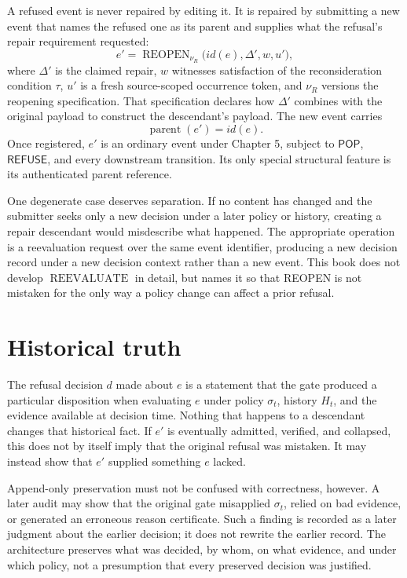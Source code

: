 \documentclass[11pt,openany]{book}
\newcommand{\Pop}{\mathsf{POP}}
\newcommand{\Refuse}{\mathsf{REFUSE}}
\begin{document}
A refused event is never repaired by editing it. It is repaired by submitting
a new event that names the refused one as its parent and supplies what the
refusal's repair requirement requested:
\[
 e'=\operatorname{REOPEN}_{\nu_R}\bigl(id(e),\Delta',w,u'\bigr),
\]
where \(\Delta'\) is the claimed repair, \(w\) witnesses satisfaction of the
reconsideration condition \(\tau\), \(u'\) is a fresh source-scoped occurrence
token, and \(\nu_R\) versions the reopening specification. That specification
declares how \(\Delta'\) combines with the original payload to construct the
descendant's payload. The new event carries
\[
 \operatorname{parent}(e')=id(e).
\]
Once registered, \(e'\) is an ordinary event under Chapter 5, subject to
\(\Pop\), \(\Refuse\), and every downstream transition. Its only special
structural feature is its authenticated parent reference.

One degenerate case deserves separation. If no content has changed and the
submitter seeks only a new decision under a later policy or history, creating a
repair descendant would misdescribe what happened. The appropriate operation
is a reevaluation request over the same event identifier, producing a new
decision record under a new decision context rather than a new event. This
book does not develop \(\operatorname{REEVALUATE}\) in detail, but names it so
that REOPEN is not mistaken for the only way a policy change can affect a
prior refusal.

\section{Historical truth}

The refusal decision \(d\) made about \(e\) is a statement that the gate
produced a particular disposition when evaluating \(e\) under policy
\(\sigma_t\), history \(H_t\), and the evidence available at decision time.
Nothing that happens to a descendant changes that historical fact. If \(e'\)
is eventually admitted, verified, and collapsed, this does not by itself imply
that the original refusal was mistaken. It may instead show that \(e'\)
supplied something \(e\) lacked.

Append-only preservation must not be confused with correctness, however. A
later audit may show that the original gate misapplied \(\sigma_t\), relied on
bad evidence, or generated an erroneous reason certificate. Such a finding is
recorded as a later judgment about the earlier decision; it does not rewrite
the earlier record. The architecture preserves what was decided, by whom, on
what evidence, and under which policy, not a presumption that every preserved
decision was justified.
\end{document}
